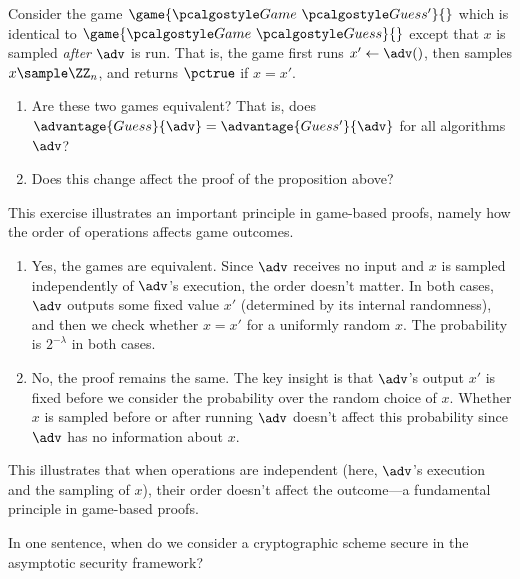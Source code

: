 \begin{exercise}\label{ex:guessing-game-equivalence}
  Consider the game $\game{\Game~\algo{Guess'}}{}$ which is identical to $\game{\Game~\algo{Guess}}{}$ except that $x$ is sampled \emph{after} $\adv$ is run.
  That is, the game first runs $x' \gets \adv()$, then samples $x \sample \ZZ_n$, and returns $\pctrue$ if $x = x'$.
  \begin{enumerate}
    \item Are these two games equivalent? That is, does $\advantage{Guess}{\adv} = \advantage{Guess'}{\adv}$ for all algorithms $\adv$?
    \item Does this change affect the proof of the proposition above?
  \end{enumerate}
  
  This exercise illustrates an important principle in game-based proofs, namely how the order of operations affects game outcomes.
\end{exercise}

\ifsolutions
\begin{mysolution}
  \begin{enumerate}
    \item Yes, the games are equivalent.
    Since $\adv$ receives no input and $x$ is sampled independently of $\adv$'s execution, the order doesn't matter.
    In both cases, $\adv$ outputs some fixed value $x'$ (determined by its internal randomness), and then we check whether $x = x'$ for a uniformly random $x$.
    The probability is $2^{-\lambda}$ in both cases.
    
    \item No, the proof remains the same.
    The key insight is that $\adv$'s output $x'$ is fixed before we consider the probability over the random choice of $x$.
    Whether $x$ is sampled before or after running $\adv$ doesn't affect this probability since $\adv$ has no information about $x$.
  \end{enumerate}
  
  This illustrates that when operations are independent (here, $\adv$'s execution and the sampling of $x$), their order doesn't affect the outcome—a fundamental principle in game-based proofs.
\end{mysolution}
\fi

\begin{exercise}\label{ex:asymptotic-security}
  In one sentence, when do we consider a cryptographic scheme secure in the asymptotic security framework?
\end{exercise}

